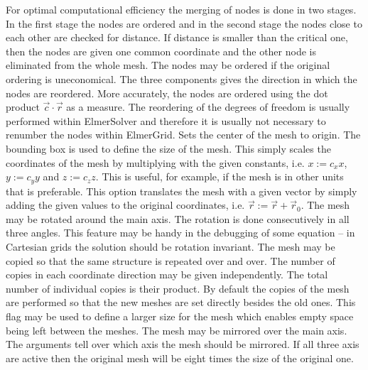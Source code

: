 For optimal computational efficiency the merging of nodes is done 
in two stages. In the first stage the nodes are ordered and in the second
stage the nodes close to each other are checked for distance. 
If distance is smaller than the critical one, then the nodes are given one
common coordinate and the other node is eliminated from the whole mesh.
%
The nodes may be ordered if the original ordering is uneconomical.
The three components gives the direction in which the nodes are reordered.
More accurately, the nodes are ordered using the 
dot product $\vec{c}\cdot\vec{r}$ as a measure.
%
The reordering of the degrees of freedom is usually performed 
within ElmerSolver and therefore 
it is usually not necessary to renumber the nodes within ElmerGrid.
%
Sets the center of the mesh to origin. The bounding box is used to define the size of the mesh. 
%
%
This simply scales the coordinates of the mesh by 
multiplying with the given constants, i.e.
$x:=c_x x$, $y:=c_y y$ and $z:=c_z z$.
This is useful, for example, if the mesh is in other units that is 
preferable. 
%
This option translates the mesh with a given vector by
simply adding the given values to the original coordinates,
i.e. $\vec{r} := \vec{r} + \vec{r}_0$.
%
The mesh may be rotated around the main axis. 
The rotation is done consecutively in all three angles.
This feature may be handy in the debugging of some equation --
in Cartesian grids the solution should be rotation invariant.
%
The mesh may be copied so that the same 
structure is repeated over and over. The number of copies in 
each coordinate direction may be given independently.
The total number of individual copies is their product.
%
By default the copies of the mesh are performed so that the 
new meshes are set directly besides the old ones. This flag may be used to define
a larger size for the mesh which enables empty space being left 
between the meshes.
%
The mesh may be mirrored over the main axis. The arguments 
tell over which axis the mesh should be mirrored. If all three axis
are active then the original mesh will be eight times the size of the original one.

